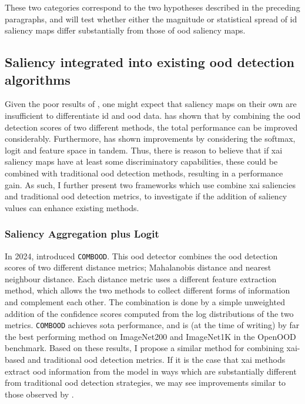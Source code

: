\documentclass[UKenglish]{uiomasterthesis} %
\theoremstyle{definition}
\begin{document}
These two categories correspond to the two hypotheses described in the preceding paragraphs, and will test whether either the magnitude or statistical spread of \ac{id} saliency maps differ substantially from those of \ac{ood} saliency maps.

\subsection{Saliency integrated into existing \ac{ood} detection algorithms}

Given the poor results of \cite{martinez}, one might expect that saliency maps on their own are insufficient to differentiate \ac{id} and \ac{ood} data. \cite{combood} has shown that by combining the \ac{ood} detection scores of two different methods, the total performance can be improved considerably. Furthermore, \cite{vim} has shown improvements by considering the softmax, logit and feature space in tandem. Thus, there is reason to believe that if \ac{xai} saliency maps have at least some discriminatory capabilities, these could be combined with traditional \ac{ood} detection methods, resulting in a performance gain. As such, I further present two frameworks which use combine \ac{xai} saliencies and traditional \ac{ood} detection metrics, to investigate if the addition of saliency values can enhance existing methods.

\subsubsection{ Saliency Aggregation plus Logit} \label{section:salpluslogitmethod}

In 2024, \cite{combood} introduced \texttt{COMBOOD}. This \ac{ood} detector combines the \ac{ood} detection scores of two different distance metrics; Mahalanobis distance and nearest neighbour distance. Each distance metric uses a different feature extraction method, which allows the two methods to collect different forms of information and complement each other. The combination is done by a simple unweighted addition of the confidence scores computed from the log distributions of the two metrics. \texttt{COMBOOD} achieves \ac{sota} performance, and is (at the time of writing) by far the best performing method on ImageNet200 and ImageNet1K in the OpenOOD benchmark. Based on these results, I propose a similar method for combining \ac{xai}-based and traditional \ac{ood} detection metrics. If it is the case that \ac{xai} methods extract \ac{ood} information from the model in ways which are substantially different from traditional \ac{ood} detection strategies, we may see improvements similar to those observed by \cite{combood}.
\end{document}
